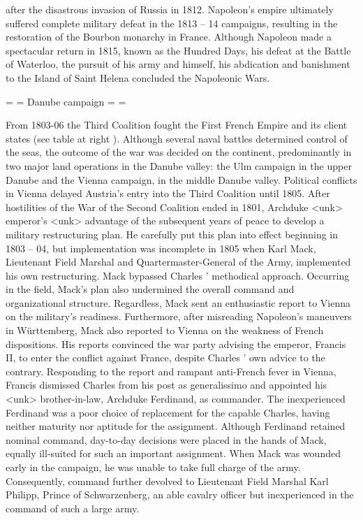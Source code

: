 after the disastrous invasion of Russia in 1812. Napoleon's empire ultimately suffered complete military defeat in the 1813 – 14 campaigns, resulting in the restoration of the Bourbon monarchy in France. Although Napoleon made a spectacular return in 1815, known as the Hundred Days, his defeat at the Battle of Waterloo, the pursuit of his army and himself, his abdication and banishment to the Island of Saint Helena concluded the Napoleonic Wars. 

= = Danube campaign = = 

From 1803-06 the Third Coalition fought the First French Empire and its client states (see table at right ). Although several naval battles determined control of the seas, the outcome of the war was decided on the continent, predominantly in two major land operations in the Danube valley: the Ulm campaign in the upper Danube and the Vienna campaign, in the middle Danube valley. 
Political conflicts in Vienna delayed Austria's entry into the Third Coalition until 1805. After hostilities of the War of the Second Coalition ended in 1801, Archduke <unk> emperor's <unk> advantage of the subsequent years of peace to develop a military restructuring plan. He carefully put this plan into effect beginning in 1803 – 04, but implementation was incomplete in 1805 when Karl Mack, Lieutenant Field Marshal and Quartermaster-General of the Army, implemented his own restructuring. Mack bypassed Charles ' methodical approach. Occurring in the field, Mack's plan also undermined the overall command and organizational structure. Regardless, Mack sent an enthusiastic report to Vienna on the military's readiness. Furthermore, after misreading Napoleon's maneuvers in W\"{u}rttemberg, Mack also reported to Vienna on the weakness of French dispositions. His reports convinced the war party advising the emperor, Francis II, to enter the conflict against France, despite Charles ' own advice to the contrary. Responding to the report and rampant anti-French fever in Vienna, Francis dismissed Charles from his post as generalissimo and appointed his <unk> brother-in-law, Archduke Ferdinand, as commander. 
The inexperienced Ferdinand was a poor choice of replacement for the capable Charles, having neither maturity nor aptitude for the assignment. Although Ferdinand retained nominal command, day-to-day decisions were placed in the hands of Mack, equally ill-suited for such an important assignment. When Mack was wounded early in the campaign, he was unable to take full charge of the army. Consequently, command further devolved to Lieutenant Field Marshal Karl Philipp, Prince of Schwarzenberg, an able cavalry officer but inexperienced in the command of such a large army. 

